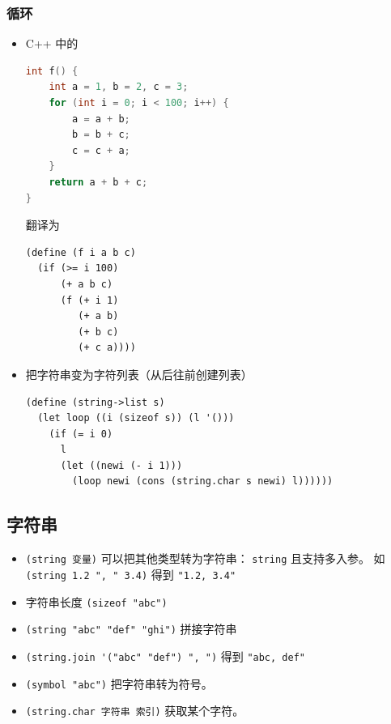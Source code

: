 \subsubsection{循环}
\begin{itemize}
\item C++ 中的
\begin{lstlisting}[language=cpp]
int f() {
    int a = 1, b = 2, c = 3;
    for (int i = 0; i < 100; i++) {
        a = a + b;
        b = b + c;
        c = c + a;
    }
    return a + b + c;
}
\end{lstlisting}
翻译为
\begin{lstlisting}[language=none]
(define (f i a b c)
  (if (>= i 100)
      (+ a b c)
      (f (+ i 1)
         (+ a b)
         (+ b c)
         (+ c a))))
\end{lstlisting}

\item 把字符串变为字符列表（从后往前创建列表）
\begin{lstlisting}[language=none]
(define (string->list s)
  (let loop ((i (sizeof s)) (l '()))
    (if (= i 0)
	  l
	  (let ((newi (- i 1)))
	    (loop newi (cons (string.char s newi) l))))))
\end{lstlisting}
\end{itemize}

\subsection{字符串}
\begin{itemize}
\item \verb`(string 变量)` 可以把其他类型转为字符串： \verb`string` 且支持多入参。 如 \verb`(string 1.2 ", " 3.4)` 得到 \verb`"1.2, 3.4"`
\item 字符串长度 \verb`(sizeof "abc")`
\item \verb`(string "abc" "def" "ghi")` 拼接字符串
\item \verb`(string.join '("abc" "def") ", ")` 得到 \verb`"abc, def"`
\item \verb`(symbol "abc")` 把字符串转为符号。
\item \verb`(string.char 字符串 索引)` 获取某个字符。
\end{itemize}


